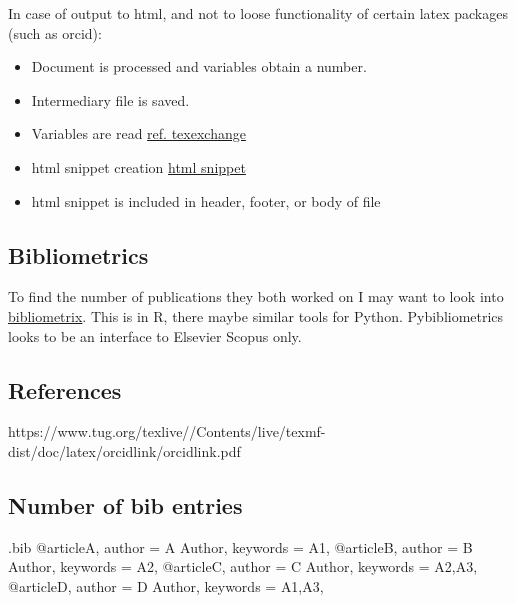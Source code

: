 \documentclass[
  letterpaper,
  DIV=11,
  numbers=noendperiod]{scrartcl}
\providecommand{\tightlist}{%
  \setlength{\itemsep}{0pt}\setlength{\parskip}{0pt}}\usepackage{longtable,booktabs,array}
\begin{document}
In case of output to html, and not to loose functionality of certain
latex packages (such as orcid):

\begin{itemize}
\tightlist
\item
  Document is processed and variables obtain a number.
\item
  Intermediary file is saved.
\item
  Variables are read
  \href{https://tex.stackexchange.com/questions/321346/how-to-read-a-variable-from-a-file-in-latex}{ref.
  texexchange}
\item
  html snippet creation \href{https://texfaq.org/FAQ-LaTeX2HTML}{html
  snippet}
\item
  html snippet is included in header, footer, or body of file
\end{itemize}

\hypertarget{bibliometrics}{%
\subsection{Bibliometrics}\label{bibliometrics}}

To find the number of publications they both worked on I may want to
look into \href{https://www.bibliometrix.org/home/}{bibliometrix}. This
is in R, there maybe similar tools for Python. Pybibliometrics \href{}{}
looks to be an interface to Elsevier Scopus only.

\hypertarget{references}{%
\subsection{References}\label{references}}

https://www.tug.org/texlive//Contents/live/texmf-dist/doc/latex/orcidlink/orcidlink.pdf

\hypertarget{number-of-bib-entries}{%
\subsection{Number of bib entries}\label{number-of-bib-entries}}

\newcommand*{\listcounted}{}

\makeatletter
{}
\makeatother

\begin{filecontents}{\jobname.bib}
@article{A,
  author          = {A Author},
  keywords        = {A1},
}
@article{B,
  author          = {B Author},
  keywords        = {A2},
}
@article{C,
  author          = {C Author},
  keywords        = {A2,A3},
}
@article{D,
  author          = {D Author},
  keywords        = {A1,A3},
}
\end{filecontents}

\end{document}
